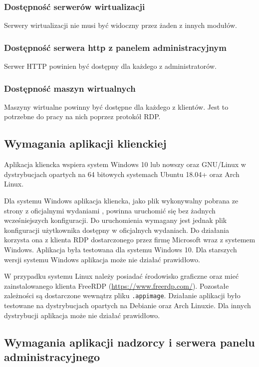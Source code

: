 \documentclass[../opis-rozwiazania.tex]{subfiles}
\begin{document}
\subsubsection{Dostępność serwerów wirtualizacji}
Serwery wirtualizacji nie musi być widoczny przez żaden z innych modułów.

\subsubsection{Dostępność serwera http z panelem administracyjnym}
Serwer HTTP powinien być dostępny dla każdego z administratorów.

\subsubsection{Dostępność maszyn wirtualnych}
Maszyny wirtualne powinny być dostępne dla każdego z klientów.
Jest to potrzebne do pracy na nich poprzez protokół RDP.

\subsection{Wymagania aplikacji klienckiej}
Aplikacja kliencka wspiera system Windows 10 lub nowszy oraz GNU/Linux w dystrybucjach opartych na 64 bitowych systemach Ubuntu 18.04+ oraz Arch Linux.

Dla systemu Windows aplikacja kliencka, jako plik wykonywalny pobrana ze strony z oficjalnymi wydaniami \parencite{ocd-client-releases}, powinna uruchomić się bez żadnych wcześniejszych konfiguracji. Do uruchomienia wymagany jest jednak plik konfiguracji użytkownika dostępny w oficjalnych wydaniach.
Do działania korzysta ona z klienta RDP dostarczonego przez firmę Microsoft wraz z systemem Windows.
Aplikacja była testowana dla systemu Windows 10.
Dla starszych wersji systemu Windows aplikacja może nie działać prawidłowo.

W przypadku systemu Linux należy posiadać środowisko graficzne oraz mieć zainstalowanego klienta FreeRDP (\url{https://www.freerdp.com/}).
Pozostałe zależności są dostarczone wewnątrz pliku \texttt{.appimage}.
Działanie aplikacji było testowane na dystrybucjach opartych na Debianie oraz Arch Linuxie.
Dla innych dystrybucji aplikacja może nie działać prawidłowo.

\subsection{Wymagania aplikacji nadzorcy i serwera panelu administracyjnego}
\end{document}
